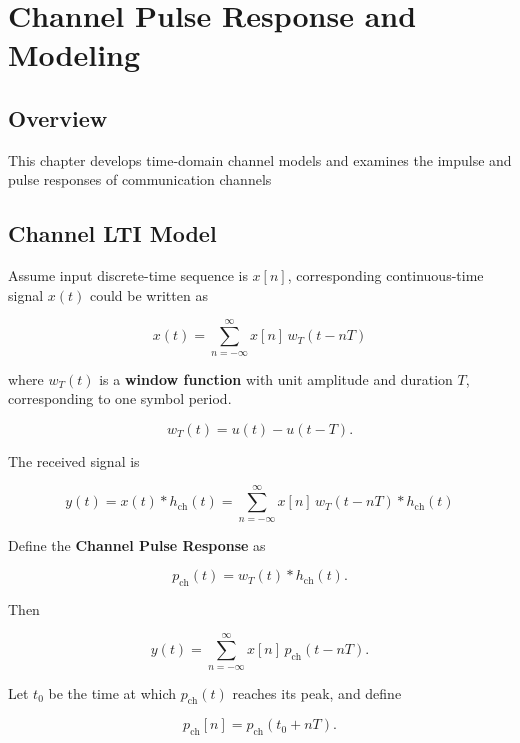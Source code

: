 \chapter{Channel Pulse Response and Modeling}

\section{Overview}

This chapter develops time-domain channel models and examines
the impulse and pulse responses of communication channels

\section{Channel LTI Model}
Assume input discrete-time sequence is \(x[n]\), corresponding continuous-time signal \(x(t)\) could be written as

\begin{equation}
x(t)=\sum_{n=-\infty}^{\infty}x[n]\,w_T(t-nT)
\end{equation}

where \(w_T(t)\) is a \textbf{window function} with unit amplitude and duration \(T\), corresponding to one symbol period.

\begin{equation}
w_T(t)=u(t)-u(t-T).
\end{equation}

The received signal is

\begin{equation}
y(t)=x(t)*h_{\mathrm{ch}}(t)=\sum_{n=-\infty}^{\infty}x[n]\,w_T(t-nT)*h_{\mathrm{ch}}(t)
\end{equation}

Define the \textbf{Channel Pulse Response} as

\begin{equation}
p_{\mathrm{ch}}(t)
=
w_T(t)*h_{\mathrm{ch}}(t).
\end{equation}

Then

\begin{equation}
y(t)
=
\sum_{n=-\infty}^{\infty}
x[n]\,
p_{\mathrm{ch}}(t-nT).
\end{equation}

Let \(t_0\) be the time at which \(p_{\mathrm{ch}}(t)\) reaches its peak, and define

\begin{equation}
p_{\mathrm{ch}}[n]
=
p_{\mathrm{ch}}(t_0+nT).
\end{equation}

